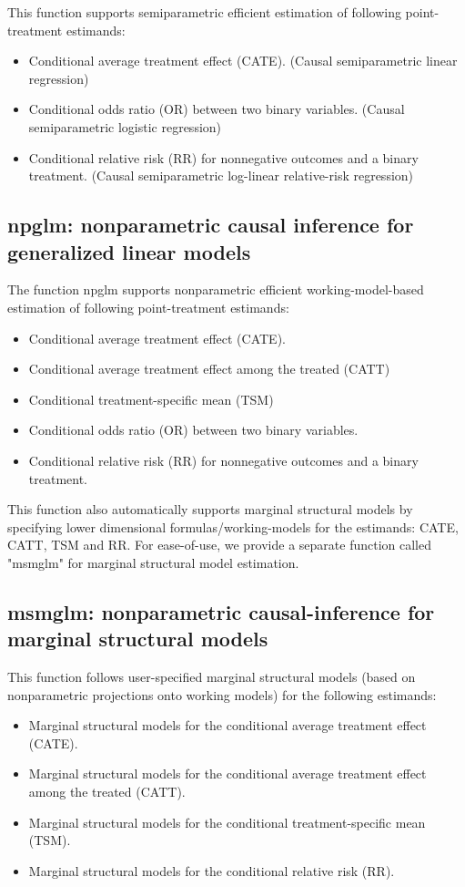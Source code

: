 \documentclass[article]{jss}
\begin{document}
This function supports semiparametric efficient estimation of following point-treatment estimands:

\begin{itemize}
\item Conditional average treatment effect (CATE). (Causal semiparametric linear regression)
\item Conditional odds ratio (OR) between two binary variables. (Causal semiparametric logistic regression)
\item Conditional relative risk (RR) for nonnegative outcomes and a binary treatment. (Causal semiparametric log-linear relative-risk regression)

\end{itemize}



\subsection{npglm: nonparametric causal inference for generalized linear models}

The function npglm supports nonparametric efficient working-model-based estimation of following point-treatment estimands:

\begin{itemize}
\item Conditional average treatment effect (CATE).
\item Conditional average treatment effect among the treated (CATT)
\item Conditional treatment-specific mean (TSM)
\item Conditional odds ratio (OR) between two binary variables. 
\item Conditional relative risk (RR) for nonnegative outcomes and a binary treatment.  
\end{itemize}

This function also automatically supports marginal structural models by specifying lower dimensional formulas/working-models for the estimands: CATE, CATT, TSM and RR. For ease-of-use, we provide a separate function called "msmglm" for marginal structural model estimation.

\subsection{msmglm: nonparametric causal-inference for marginal structural models}
This function follows user-specified marginal structural models (based on nonparametric projections onto working models) for the following estimands:
\begin{itemize}
\item Marginal structural models for the conditional average treatment effect (CATE).
\item Marginal structural models for the conditional average treatment effect among the treated (CATT).
\item Marginal structural models for the conditional treatment-specific mean (TSM).
\item Marginal structural models for the conditional relative risk (RR). 
\end{itemize}
\end{document}
